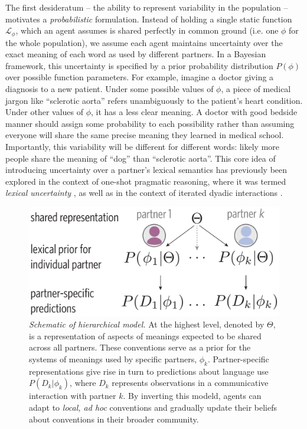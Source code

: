 The first desideratum -- the ability to represent variability in the population -- motivates a \emph{probabilistic} formulation.
Instead of holding a single static function $\mathcal{L}_{\phi}$, which an agent assumes is shared perfectly in common ground (i.e. one $\phi$ for the whole population), we assume each agent maintains uncertainty over the exact meaning of each word as used by different partners.
In a Bayesian framework, this uncertainty is specified by a prior probability distribution $P(\phi)$ over possible function parameters.
For example, imagine a doctor giving a diagnosis to a new patient.
Under some possible values of $\phi$, a piece of medical jargon like ``sclerotic aorta'' refers unambiguously to the patient's heart condition.
Under other values of $\phi$, it has a less clear meaning. 
A doctor with good bedside manner should assign some probability to each possibility rather than assuming everyone will share the same precise meaning they learned in medical school. 
Importantly, this variability will be different for different words: likely more people share the meaning of ``dog'' than ``sclerotic aorta''.
This core idea of introducing uncertainty over a partner's lexical semantics has previously been explored in the context of one-shot pragmatic reasoning, where it was termed \emph{lexical uncertainty} \cite{BergenGoodmanLevy12_Alternatives,PottsLevy15_Or,bergen_pragmatic_2016,potts2016embedded}, as well as in the context of iterated dyadic interactions \cite{SmithGoodmanFrank13_RecursivePragmaticReasoningNIPS}. 

\begin{figure}[b!]
\centering
\includegraphics[scale=0.35]{./figures/task1_model.pdf}
\vspace{.5em}
\caption{\emph{Schematic of hierarchical model.} At the highest level, denoted by $\Theta$, is a representation of aspects of meanings expected to be shared across all partners. These conventions serve as a prior for the systems of meanings used by specific partners, $\phi_k$. Partner-specific representations give rise in turn to predictions about language use $P(D_k|\phi_k)$, where $D_k$ represents observations in a communicative interaction with partner $k$. By inverting this modeld, agents can adapt to \emph{local, ad hoc} conventions and gradually update their beliefs about conventions in their broader community.}
\label{fig:model_schematic}
\end{figure}

